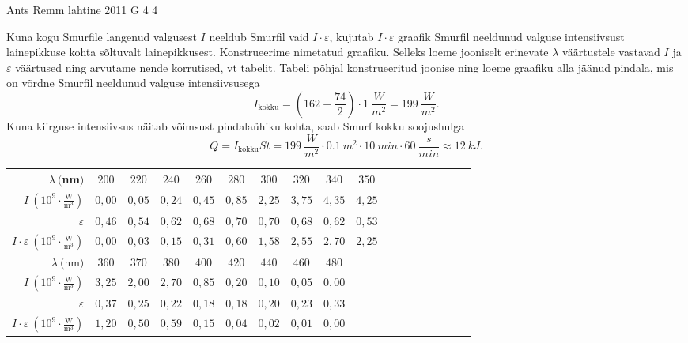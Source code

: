 \documentclass[11pt]{article}
\begin{document}
{%
{Ants Remm} %
{lahtine} %
{2011} %
{G 4} %
{4} %
{

\ifSolution
Kuna kogu Smurfile langenud valgusest $I$ neeldub Smurfil vaid $ I \cdot
\varepsilon $, kujutab $ I \cdot \varepsilon $ graafik Smurfil neeldunud valguse
intensiivsust lainepikkuse kohta sõltuvalt lainepikkusest. Konstrueerime
nimetatud graafiku. Selleks loeme jooniselt erinevate $ \lambda $ väärtustele
vastavad $ I $ ja $ \varepsilon $ väärtused ning arvutame nende korrutised, vt
tabelit. Tabeli põhjal konstrueeritud joonise ning loeme graafiku alla jäänud
pindala, mis on võrdne Smurfil neeldunud valguse intensiivsusega
\[
I_{\mathrm{kokku}} =
(162+\frac{74}{2}) \cdot \SI{1}{\frac{W}{m^2}} = \SI{199}{\frac{W}{m^2}}.
\]
Kuna kiirguse intensiivsus näitab võimsust pindalaühiku kohta, saab Smurf kokku soojushulga
\[ Q = I_{\mathrm{kokku}}St =
\SI{199}{\frac{W}{m^2}} \cdot \SI{0,1}{m^2} \cdot \SI{10}{min} \cdot
\SI{60}{\frac{s}{min}} \approx \SI{12}{kJ}.\]


\begin{tabular}{r|c|c|c|c|c|c|c|c|c|c|c|c|c|c|c|c|c|}
	\hline
	$ \lambda \ ($nm$) $&$ 200 $&$ 220 $&$ 240 $&$ 260 $&$ 280 $&$ 300 $&$ 320 $&$ 340 $&$ 350 $\\
	\hline
	$ I \ (10^9 \cdot \frac{\text{W}}{\text{m}^3}) $&$ 0,00 $&$ 0,05 $&$ 0,24 $&$ 0,45 $&$ 0,85 $&$ 2,25 $&$ 3,75 $&$ 4,35 $&$ 4,25 $\\
	\hline
	$ \varepsilon $&$ 0,46 $&$ 0,54 $&$ 0,62 $&$ 0,68 $&$ 0,70 $&$ 0,70 $&$ 0,68 $&$ 0,62 $&$ 0,53 $\\
	\hline
	$ I \cdot \varepsilon \ (10^9 \cdot \frac{\text{W}}{\text{m}^3}) $&$ 0,00 $&$ 0,03 $&$ 0,15 $&$ 0,31 $&$ 0,60 $&$ 1,58 $&$ 2,55 $&$ 2,70 $&$ 2,25 $\\
	\hline
	\hline
	$ \lambda \ ($nm$) $&$ 360 $&$ 370 $&$ 380 $&$ 400 $&$ 420 $&$ 440 $&$ 460 $&$ 480 $\\
	\hline
	$ I \ (10^9 \cdot \frac{\text{W}}{\text{m}^3}) $&$ 3,25 $&$ 2,00 $&$ 2,70 $&$ 0,85 $&$ 0,20 $&$ 0,10 $&$ 0,05 $&$ 0,00 $\\
	\hline
	$ \varepsilon $&$ 0,37 $&$ 0,25 $&$ 0,22 $&$ 0,18 $&$ 0,18 $&$ 0,20 $&$ 0,23 $&$ 0,33 $\\
	\hline
	$ I \cdot \varepsilon \ (10^9 \cdot \frac{\text{W}}{\text{m}^3}) $&$ 1,20 $&$ 0,50 $&$ 0,59 $&$ 0,15 $&$ 0,04 $&$ 0,02 $&$ 0,01 $&$ 0,00 $\\ 	
\end{tabular}

}}
\end{document}
